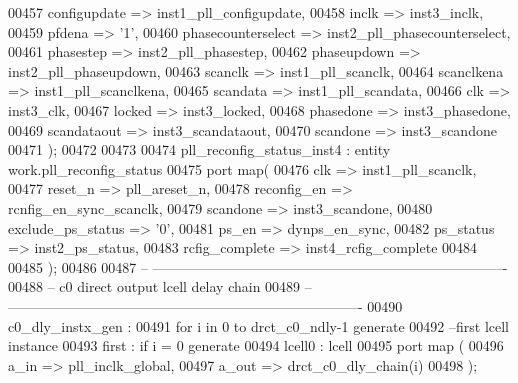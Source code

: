 \begin{DoxyCode}
00457       configupdate         => inst1_pll_configupdate,
00458       inclk                => inst3_inclk,
00459       pfdena               => '1',
00460       phasecounterselect   => inst2_pll_phasecounterselect,
00461       phasestep            => inst2_pll_phasestep,
00462       phaseupdown          => inst2_pll_phaseupdown,
00463       scanclk              => inst1_pll_scanclk,
00464       scanclkena           => inst1_pll_scanclkena,
00465       scandata             => inst1_pll_scandata,
00466       clk                  => inst3_clk,
00467       locked               => inst3_locked,
00468       phasedone            => inst3_phasedone,
00469       scandataout          => inst3_scandataout,
00470       scandone             => inst3_scandone
00471 \textcolor{vhdlchar}{)};
00472    
00473    
00474 pll\_reconfig\_status\_inst4 : \textcolor{keywordflow}{entity} work.pll_reconfig_status
00475    \textcolor{keywordflow}{port} \textcolor{keywordflow}{map}(
00476       clk               => inst1_pll_scanclk,
00477       reset_n           => pll_areset_n,
00478       reconfig_en       => rcnfig_en_sync_scanclk,
00479       scandone          => inst3_scandone,
00480       exclude_ps_status => '0',
00481       ps_en             => dynps_en_sync,
00482       ps_status         => inst2_ps_status,
00483       rcfig_complete    => inst4_rcfig_complete
00484       
00485       \textcolor{vhdlchar}{)};   
00486 
00487 \textcolor{keyword}{-- ----------------------------------------------------------------------------}
00488 \textcolor{keyword}{-- c0 direct output lcell delay chain }
00489 \textcolor{keyword}{-- ----------------------------------------------------------------------------   }
00490 \textcolor{vhdlchar}{c0\_dly\_instx\_gen} \textcolor{vhdlchar}{:} 
00491 \textcolor{keywordflow}{for} \textcolor{vhdlchar}{i} \textcolor{keywordflow}{in} \textcolor{vhdllogic}{}\textcolor{vhdllogic}{0} \textcolor{keywordflow}{to} \textcolor{vhdlchar}{drct_c0_ndly}\textcolor{vhdlchar}{-}\textcolor{vhdllogic}{}\textcolor{vhdllogic}{1} \textcolor{keywordflow}{generate}
00492 \textcolor{keyword}{   --first lcell instance}
00493    \textcolor{vhdlchar}{first} \textcolor{vhdlchar}{:} \textcolor{keywordflow}{if} \textcolor{vhdlchar}{i} \textcolor{vhdlchar}{=} \textcolor{vhdllogic}{}\textcolor{vhdllogic}{0} \textcolor{keywordflow}{generate} 
00494    lcell0 : lcell 
00495       \textcolor{keywordflow}{port} \textcolor{keywordflow}{map} (
00496          a\_in  => pll_inclk_global,
00497          a\_out => drct_c0_dly_chain\textcolor{vhdlchar}{(}i\textcolor{vhdlchar}{)}
00498          \textcolor{vhdlchar}{)};

\end{DoxyCode}
